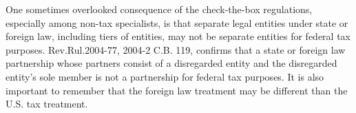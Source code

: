 % 
% 

One sometimes overlooked consequence of the check-the-box regulations, especially among non-tax specialists, is that separate legal entities under state or foreign law, including tiers of entities, may not be separate entities for federal tax purposes.  Rev.\@ Rul.\@ 2004-77, 2004-2 C.B. 119, confirms that a state or foreign law partnership whose partners consist of a disregarded entity and the disregarded entity's sole member is not a partnership for federal tax purposes.  It is also important to remember that the foreign law treatment may be different than the U.S. tax treatment.

